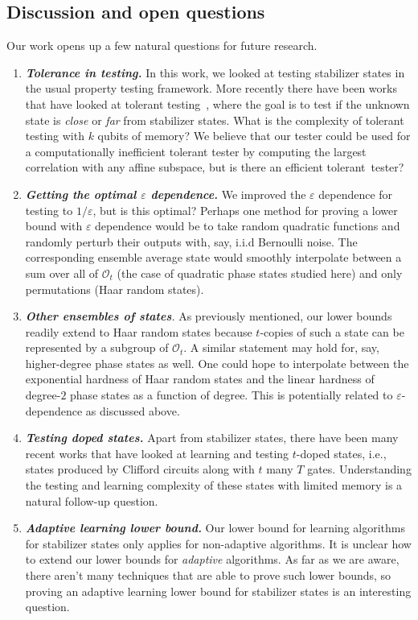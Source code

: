 \documentclass[11pt]{article}
\newcommand{\eps}{\varepsilon}
\newcommand{\Oc}{\mathcal{O}}
\begin{document}
\subsection{Discussion and open questions}
Our work opens up a few natural questions  for future research. 
\begin{enumerate}
    \item \emph{\textbf{Tolerance in testing.}} In this work, we looked at testing stabilizer states in the usual property testing framework. More recently there have been works that have looked at tolerant testing~\cite{ad2024tolerant,bao2024tolerant,mehraban2024improved}, where the goal is to test if the unknown state is \emph{close} or \emph{far} from stabilizer states. What is the complexity of tolerant testing with $k$ qubits of memory? We believe that our tester could be used for a computationally inefficient tolerant tester by computing the largest correlation with any affine subspace, but is there an efficient tolerant~tester?
\item    \emph{\textbf{Getting the optimal $\varepsilon$ dependence.}} We improved the $\eps$ dependence for testing to $1/\eps$, but is this optimal? Perhaps one method for proving a lower bound with $\eps$ dependence would be to take random quadratic functions and randomly perturb their outputs with, say, i.i.d Bernoulli noise. The corresponding ensemble average state would smoothly interpolate between a sum over all of $\Oc_t$ (the case of quadratic phase states studied here) and only permutations (Haar random states).
    \item \emph{{\textbf{Other ensembles of states}}.} As previously mentioned, our lower bounds readily extend to Haar random states because $t$-copies of such a state can be represented by a subgroup of $\Oc_t$. A similar statement may hold for, say, higher-degree phase states as well. One could hope to interpolate between the exponential hardness of Haar random states and the linear hardness of degree-$2$ phase states as a function of degree. This is potentially related to $\eps$-dependence as discussed above.
    \item \emph{\textbf{Testing doped states.}} Apart from stabilizer states, there have been many recent works that have looked at learning and testing $t$-doped states, i.e., states produced by Clifford circuits along with $t$ many $T$ gates. Understanding the testing and learning complexity of these states with limited memory is a natural follow-up question.
    \item \emph{\textbf{Adaptive learning lower bound.}} Our  lower bound for learning algorithms for stabilizer states only applies for non-adaptive algorithms. It is unclear how to extend our lower bounds for \emph{adaptive} algorithms. As far as we are aware, there aren't many techniques that are able to prove such lower bounds, so proving an adaptive learning lower bound for stabilizer states is an interesting question.

\end{enumerate}
\end{document}
